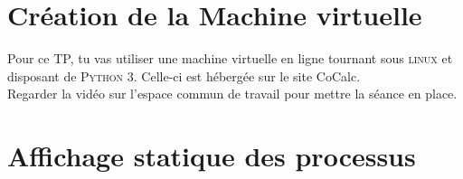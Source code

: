 \documentclass[12pt,a4paper,article,english,firamath]{nsi}
\begin{document}
\maketitle

\section*{Création de la Machine virtuelle}

Pour ce TP, tu vas utiliser une machine virtuelle en ligne tournant sous \textsc{linux} et disposant de \textsc{Python 3}. Celle-ci est hébergée sur le site CoCalc.\\

Regarder la vidéo sur l'espace commun de travail pour mettre la séance en place.
\section*{Affichage statique des processus}
\end{document}
